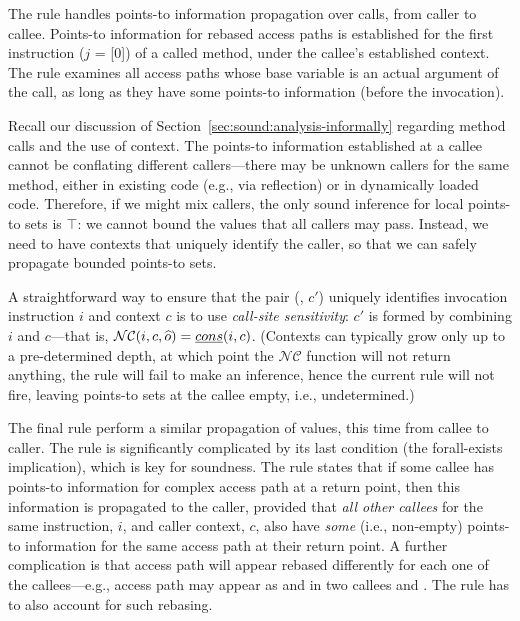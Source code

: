 The  rule handles points-to information propagation over calls, from caller to callee. Points-to information for rebased access paths is established for the first instruction ($j$ = [0]) of a called method, under the callee's established context. The rule examines all access paths whose base variable is an actual argument of the call, as long as they have some points-to information (before the invocation).

Recall our discussion of Section~\ref{sec:sound:analysis-informally} regarding method calls and the use of context. The points-to information established at a callee cannot be conflating different callers---there may be unknown callers for the same method, either in existing code (e.g., via reflection) or in dynamically loaded code. Therefore, if we might mix callers, the only sound inference for local points-to sets is $\top$: we cannot bound the values that all callers may pass. Instead, we need to have contexts that uniquely identify the caller, so that we can safely propagate bounded points-to sets.

A straightforward way to ensure that the pair (, $c'$) uniquely identifies invocation instruction $i$ and context $c$ is to use \emph{call-site sensitivity}: $c'$ is formed by combining $i$ and $c$---that is, $\mathcal{NC}(i, c, \widehat{o}) = \emph{cons}(i, c)$. (Contexts can typically grow only up to a pre-determined depth, at which point the $\mathcal{NC}$ function will not return anything, the  rule will fail to make an inference, hence the current rule will not fire, leaving points-to sets at the callee empty, i.e., undetermined.)


The final rule perform a similar propagation of values, this time from callee to caller. The rule is significantly complicated by its last condition (the forall-exists implication), which is key for soundness. The rule states that if some callee has points-to information for complex access path  at a return point, then this information is propagated to the caller, provided that \todo{} \emph{all other callees} for the same instruction, $i$, and caller context, $c$, also have \emph{some} (i.e., non-empty) points-to information for the same access path  at their return point. A further complication is that access path  will appear rebased differently for each one of the callees---e.g., access path  may appear as  and  in two callees  and . The rule has to also account for such rebasing.

